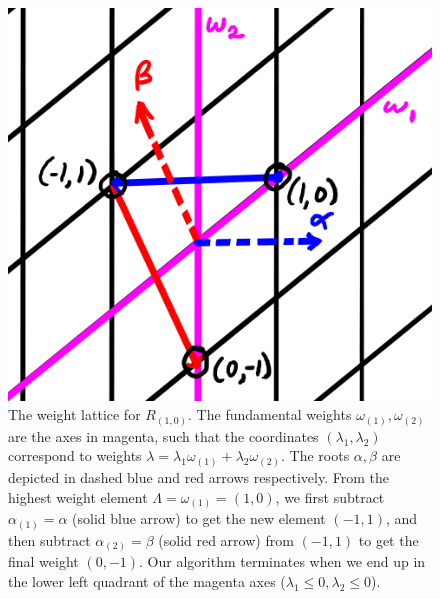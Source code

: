 \begin{figure}
    \centering
    \includegraphics{2018/11/20181122_s1-0.png}
    \caption{The weight lattice for $R_{(1,0)}$. The fundamental weights $\omega_{(1)},\omega_{(2)}$ are the axes in magenta, such that the coordinates $(\lambda_1,\lambda_2)$ correspond to weights $\lambda=\lambda_1\omega_{(1)}+\lambda_2 \omega_{(2)}.$ The roots $\alpha,\beta$ are depicted in dashed blue and red arrows respectively. From the highest weight element $\Lambda=\omega_{(1)}=(1,0)$, we first subtract $\alpha_{(1)}=\alpha$ (solid blue arrow) to get the new element $(-1,1)$, and then subtract $\alpha_{(2)}=\beta$ (solid red arrow) from $(-1,1)$ to get the final weight $(0,-1)$. Our algorithm terminates when we end up in the lower left quadrant of the magenta axes ($\lambda_1 \leq 0, \lambda_2 \leq 0$).}
    \label{fig:s1-0}
\end{figure}

